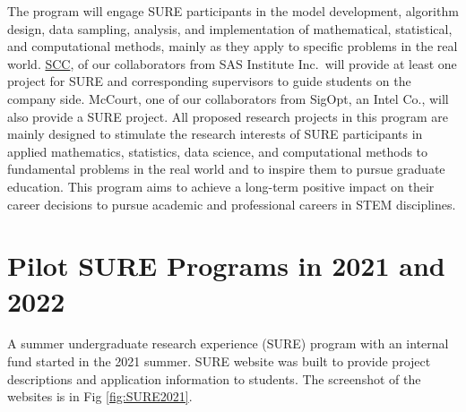 \documentclass[11pt]{NSFamsart}
\newcommand{\SCTC}{\hyperlink{SCTClink}{SCC}\xspace}
\begin{document}
The program will engage SURE
participants in the model development, algorithm design, data sampling, analysis, and implementation
of mathematical, statistical, and computational methods, mainly as they apply to specific problems
in the real world. \SCTC, of our collaborators from SAS Institute Inc.\ will provide at least one project for SURE and corresponding supervisors to guide students on the company side. McCourt, one of our collaborators from SigOpt, an Intel Co., will also provide a SURE project. All proposed research projects in this program are mainly designed to stimulate
the research interests of SURE participants in applied mathematics, statistics, data science, and computational
methods to fundamental problems in the real world and to inspire them to pursue graduate education. This
program aims to achieve a long-term positive impact on their career decisions to pursue academic and
professional careers in STEM disciplines.



 






\section{Pilot SURE Programs in 2021 and 2022}
\label{sec:SURE}
A summer undergraduate research experience (SURE) program  with an internal fund started in the 2021 summer. SURE website  \cite{SUREWeb} was built to provide  project descriptions and application information to students. The screenshot of the websites is in Fig \ref{fig:SURE2021}.
\end{document}
